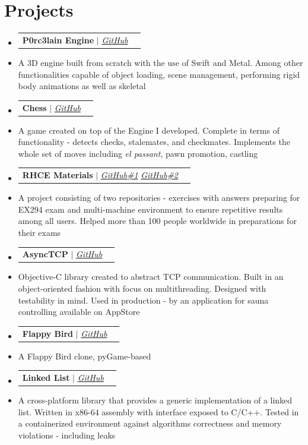 \documentclass[letterpaper,11pt]{article}
\makeatletter
\newcommand{\resumeItem}[1]{
 \item\small{
 {#1 \vspace{-2pt}}
 }
}
\newcommand{\resumeProjectHeading}[2]{
 \vspace{-2pt}\item
 \begin{tabular*}{0.97\textwidth}{l@{\extracolsep{\fill}}r}
 \small#1 & #2 \\
 \end{tabular*}\vspace{-7pt}
}
\newcommand{\resumeSubHeadingListStart}{\begin{itemize}[leftmargin=0.15in, label={}]}
\newcommand{\resumeSubHeadingListEnd}{\end{itemize}}
\makeatother
\begin{document}

\section{Projects}
 \vspace{3pt}
 \resumeSubHeadingListStart
 \resumeProjectHeading{\textbf{P0rc3lain Engine} $|$ \emph{\href{https://github.com/P0rc3lain/Engine}{\color{blue}GitHub}}}{}
 \resumeItem{A 3D engine built from scratch with the use of Swift and Metal.
 Among other functionalities capable of object loading, scene management, performing rigid body animations as well as skeletal}
 \resumeProjectHeading{\textbf{Chess} $|$ \emph{\href{https://github.com/P0rc3lain/Chess}{\color{blue}GitHub}}}{}
 \resumeItem{A game created on top of the Engine I developed. 
 Complete in terms of functionality - detects checks, stalemates, and checkmates. 
 Implements the whole set of moves including \textit{el passant}, pawn promotion, castling}
 \resumeProjectHeading{\textbf{RHCE Materials} $|$ \emph{\href{https://github.com/mateuszstompor/rhce-ex294-exam}{\color{blue}GitHub\#1}} \emph{\href{https://github.com/mateuszstompor/rhce-environment}{\color{blue}GitHub\#2}}}{}
 \resumeItem{A project consisting of two repositories - exercises with answers preparing for EX294 exam and multi-machine environment to ensure repetitive results among all users.
 Helped more than 100 people worldwide in preparations for their exams}
 \resumeProjectHeading{\textbf{AsyncTCP} $|$ \emph{\href{https://github.com/mateuszstompor/AsyncTCP}{\color{blue}GitHub}}}{}
 \resumeItem{Objective-C library created to abstract TCP communication. 
 Built in an object-oriented fashion with focus on multithreading.
 Designed with testability in mind.
 Used in production - by an application for sauna controlling available on AppStore}
 \resumeProjectHeading{\textbf{Flappy Bird} $|$ \emph{\href{https://github.com/mateuszstompor/FlappyBird}{\color{blue}GitHub}}}{}
 \resumeItem{A Flappy Bird clone, pyGame-based}
 \resumeProjectHeading{\textbf{Linked List} $|$ \emph{\href{https://github.com/mateuszstompor/Linked-List-x86-64-ASM}{\color{blue}GitHub}}}{}
 \resumeItem{A cross-platform library that provides a generic implementation of a linked list. 
 Written in x86-64 assembly with interface exposed to C/C++. 
 Tested in a containerized environment against algorithms correctness and memory violations - including leaks}
 \resumeSubHeadingListEnd

\end{document}
